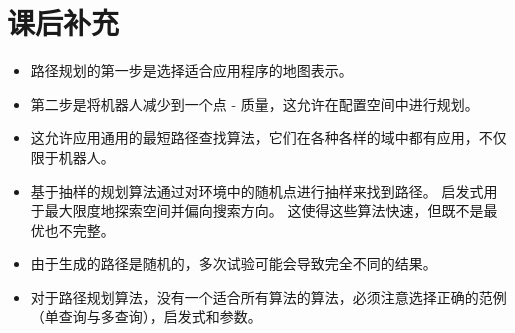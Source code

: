\section*{课后补充}
\begin{itemize}

\item 路径规划的第一步是选择适合应用程序的地图表示。
\item 第二步是将机器人减少到一个点 - 质量，这允许在配置空间中进行规划。
\item 这允许应用通用的最短路径查找算法，它们在各种各样的域中都有应用，不仅限于机器人。
\item 基于抽样的规划算法通过对环境中的随机点进行抽样来找到路径。 启发式用于最大限度地探索空间并偏向搜索方向。 这使得这些算法快速，但既不是最优也不完整。
\item 由于生成的路径是随机的，多次试验可能会导致完全不同的结果。
\item 对于路径规划算法，没有一个适合所有算法的算法，必须注意选择正确的范例（单查询与多查询），启发式和参数。
\end{itemize}

